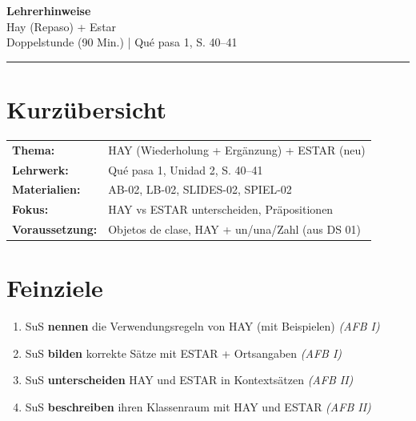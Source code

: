 \documentclass[11pt,a4paper]{article}
\begin{document}
\begin{center}
{\Large\textcolor{fach}{\textbf{Lehrerhinweise}}}\\[0.3cm]
{\large Hay (Repaso) + Estar}\\[0.2cm]
{\normalsize Doppelstunde (90 Min.) | Qué pasa 1, S. 40--41}
\end{center}

\vspace{0.5cm}
\hrule
\vspace{0.5cm}

\section*{Kurzübersicht}

\begin{tabular}{ll}
\textbf{Thema:} & HAY (Wiederholung + Ergänzung) + ESTAR (neu) \\
\textbf{Lehrwerk:} & Qué pasa 1, Unidad 2, S. 40--41 \\
\textbf{Materialien:} & AB-02, LB-02, SLIDES-02, SPIEL-02 \\
\textbf{Fokus:} & HAY vs ESTAR unterscheiden, Präpositionen \\
\textbf{Voraussetzung:} & Objetos de clase, HAY + un/una/Zahl (aus DS 01) \\
\end{tabular}

\vspace{0.5cm}

\section*{Feinziele}

\begin{enumerate}[label=\textbf{FZ\arabic*:}, leftmargin=2.5em]
    \item SuS \textbf{nennen} die Verwendungsregeln von HAY (mit Beispielen) \textit{(AFB I)}
    \item SuS \textbf{bilden} korrekte Sätze mit ESTAR + Ortsangaben \textit{(AFB I)}
    \item SuS \textbf{unterscheiden} HAY und ESTAR in Kontextsätzen \textit{(AFB II)}
    \item SuS \textbf{beschreiben} ihren Klassenraum mit HAY und ESTAR \textit{(AFB II)}
\end{enumerate}
\end{document}
